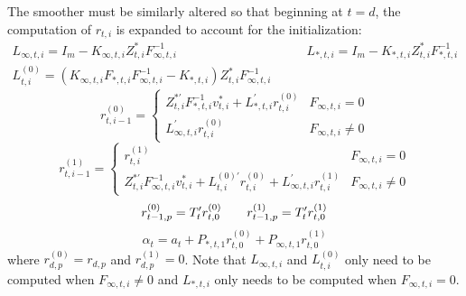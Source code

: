 \documentclass[12pt]{article}
\begin{document}
	The smoother must be similarly altered so that beginning at $t = d$, the computation of $r_{t,i}$ is expanded to account for the initialization:
	\begin{align*}
	L_{\infty,t,i} = I_m - K_{\infty,t,i} Z_{t,i}^* F_{\infty,t,i}^{-1} &\qquad
	L_{*,t,i} = I_m - K_{*,t,i} Z_{t,i}^* F_{*,t,i}^{-1} \\
	L_{t,i}^{(0)} = \left(K_{\infty,t,i} F_{*,t,i} F_{\infty,t,i}^{-1} - K_{*,t,i} \right) Z_{t,i}^* F_{\infty,t,i}^{-1} &
	\end{align*}
	\begin{equation*}
	r_{t,i-1}^{(0)} = \begin{cases} 
	   Z_{t,i}^{*\prime} F_{*,t,i}^{-1} v_{t,i}^* + L_{*,t,i}^\prime r_{t,i}^{(0)} & F_{\infty,t,i} = 0 \\
	   L_{\infty,t,i}^\prime r_{t,i}^{(0)} & F_{\infty,t,i} \neq 0	   
	\end{cases} 
	\end{equation*}
	\begin{equation*}
	r_{t,i-1}^{(1)} = \begin{cases} 
	   r_{t,i}^{(1)} & F_{\infty,t,i} = 0 \\
	   Z_{t,i}^{*\prime} F_{\infty,t,i}^{-1} v_{t,i}^* + L_{t,i}^{(0)\prime} r_{t,i}^{(0)} + L_{\infty,t,i}^\prime r_{t,i}^{(1)} & F_{\infty,t,i} \neq 0	   
	\end{cases} 
	\end{equation*}
	\begin{equation*}
	r_{t-1,p}^{(0)} = T_t^\prime r_{t,0}^{(0)} \qquad r_{t-1,p}^{(1)} = T_t^\prime r_{t,0}^{(1)}  \\
	\end{equation*}
	\begin{equation*}
	\hat{\alpha}_t = a_t + P_{*,t,1} r_{t,0}^{(0)} + P_{\infty,t,1} r_{t,0}^{(1)}
	\end{equation*}
	where $r_{d,p}^{(0)} = r_{d,p}$ and $r_{d,p}^{(1)} = 0$. Note that $L_{\infty,t,i}$ and $L_{t,i}^{(0)}$ only need to be computed when $F_{\infty,t,i} \neq 0$ and $L_{*,t,i}$ only needs to be computed when $F_{\infty,t,i} = 0$. \\
\end{document}
